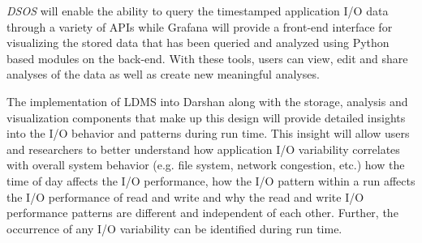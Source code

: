 
\emph{DSOS} will enable the ability to query the timestamped application I/O data through a variety of APIs while Grafana will provide a front-end interface for visualizing the stored data that has been queried and analyzed using Python based modules on the back-end. With these tools, users can view, edit and share analyses of the data as well as create new meaningful analyses. 

The implementation of LDMS into Darshan along with the storage, analysis and visualization components that make up this design will provide detailed insights into the I/O behavior and patterns during run time. This insight will allow users and researchers to better understand how application I/O variability correlates with overall system behavior (e.g. file system, network congestion, etc.) how the time of day affects the I/O performance, how the I/O pattern within a run affects the I/O performance of read and write and why the read and write I/O performance patterns are different and independent of each other. Further, the occurrence of any I/O variability can be identified during run time.

